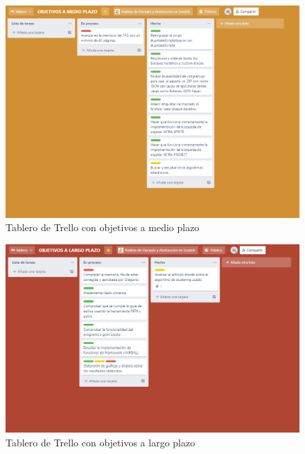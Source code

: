 \documentclass[a4paper, 12pt]{book}
\begin{document}
 \begin{figure}[h]
  	 \centering
    \includegraphics[width=15cm, keepaspectratio]{img/obj_medioplazo.png}
    \caption{Tablero de Trello con objetivos a medio plazo}
    \label{fig:tableros_trello}
 \end{figure}
 
  \begin{figure}[h]
  	 \centering
    \includegraphics[width=15cm, keepaspectratio]{img/obj_largoplazo.png}
    \caption{Tablero de Trello con objetivos a largo plazo}
    \label{fig:tableros_trello}
 \end{figure}
 
\end{document}
